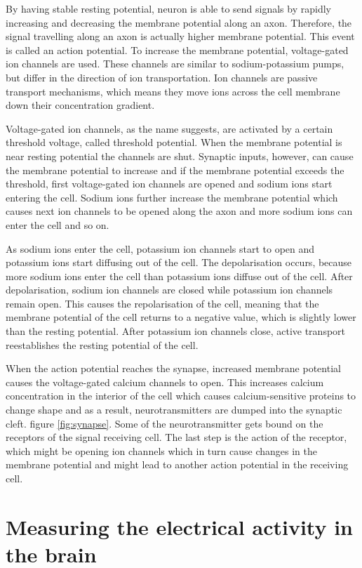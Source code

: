 By having stable resting potential, neuron is able to send signals by rapidly increasing and decreasing the membrane potential along an axon. Therefore, the signal travelling along an axon is actually higher membrane potential. This event is called an action potential. To increase the membrane potential, voltage-gated ion channels are used. These channels are similar to sodium-potassium pumps, but differ in the direction of ion transportation. Ion channels are passive transport mechanisms, which means they move ions across the cell membrane down their concentration gradient.

Voltage-gated ion channels, as the name suggests, are activated by a certain threshold voltage, called threshold potential. When the membrane potential is near resting potential the channels are shut. Synaptic inputs, however, can cause the membrane potential to increase and if the membrane potential exceeds the threshold, first voltage-gated ion channels are opened and sodium ions start entering the cell. Sodium ions further increase the membrane potential which causes next ion channels to be opened along the axon and more sodium ions can enter the cell and so on.

As sodium ions enter the cell, potassium ion channels start to open and potassium ions start diffusing out of the cell. The depolarisation occurs, because more sodium ions enter the cell than potassium ions diffuse out of the cell. After depolarisation, sodium ion channels are closed while potassium ion channels remain open. This causes the repolarisation of the cell, meaning that the membrane potential of the cell returns to a negative value, which is slightly lower than the resting potential. After potassium ion channels close, active transport reestablishes the resting potential of the cell.

When the action potential reaches the synapse, increased membrane potential causes the voltage-gated calcium channels to open. This increases calcium concentration in the interior of the cell which causes calcium-sensitive proteins to change shape and as a result, neurotransmitters are dumped into the synaptic cleft. figure \ref{fig:synapse}. Some of the neurotransmitter gets bound on the receptors of the signal receiving cell. The last step is the action of the receptor, which might be opening ion channels which in turn cause changes in the membrane potential and might lead to another action potential in the receiving cell.
 
\section{Measuring the electrical activity in the brain}

